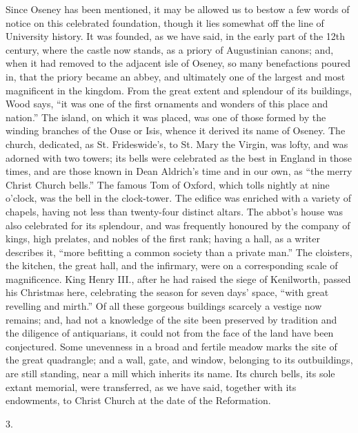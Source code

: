 Since Oseney has been
mentioned, it may be allowed us to bestow a few words of notice on
this celebrated foundation, though it lies somewhat off the line
of University history. It was founded, as we have said, in the early
part of the 12th century, where the castle now stands, as a priory of
Augustinian canons; and, when it had removed to the adjacent isle of
Oseney, so many benefactions poured in, that the priory became an
abbey, and ultimately one of the largest and most magnificent in the
kingdom. From the great extent and splendour of its buildings, Wood
says, ``it was one of the first ornaments and wonders of this place and
nation.'' The island, on which it was placed, was one of those formed
by the winding branches of the Ouse or Isis, whence it derived its
name of Oseney. The church, dedicated, as St. Frideswide's, to St.
Mary the Virgin, was lofty, and was adorned with two towers; its bells
were celebrated as the best in England in those times, and are those
known in Dean Aldrich's time and in our own, as ``the merry Christ
Church bells.'' The famous Tom of Oxford, which tolls nightly at nine o'clock,
was the bell in the clock-tower. The edifice was enriched with a
variety of chapels, having not less than twenty-four distinct altars.
The abbot's house was also celebrated for its splendour, and was
frequently honoured by the company of kings, high prelates, and nobles
of the first rank; having a hall, as a writer describes it, ``more
befitting a common society than a private man.'' The cloisters, the
kitchen, the great hall, and the infirmary, were on a corresponding
scale of magnificence. King Henry III., after he had raised the siege
of Kenilworth, passed his Christmas here, celebrating the season for
seven days' space, ``with great revelling and mirth.'' Of all these
gorgeous buildings scarcely a vestige now remains; and, had not a
knowledge of the site been preserved by tradition and the diligence of
antiquarians, it could not from the face of the land have been
conjectured. Some unevenness in a broad and fertile meadow marks the
site of the great quadrangle; and a wall, gate, and window, belonging
to its outbuildings, are still standing, near a mill which inherits
its name. Its church bells, its sole extant memorial, were
transferred, as we have said, together with its endowments, to Christ
Church at the date of the Reformation.

3.

